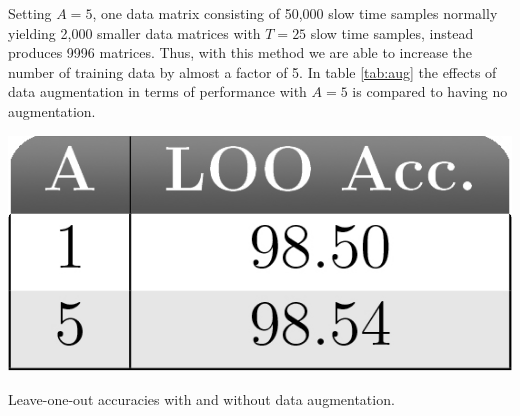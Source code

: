 Setting $A=5$, one data matrix consisting of 50,000 slow time samples normally yielding 2,000 smaller data matrices with $T=25$ slow time samples, instead produces 9996 matrices. Thus, with this method we are able to increase the number of training data by almost a factor of 5. In table \ref{tab:aug} the effects of data augmentation in terms of performance with $A=5$ is compared to having no augmentation.

\begin{table}
	\begin{center}
		\includegraphics[scale=0.7]{figs_temp/table_augmentation.jpg}
	\end{center}
	\caption{Leave-one-out accuracies with and without data augmentation.}
	\label{tab:aug}
\end{table}


